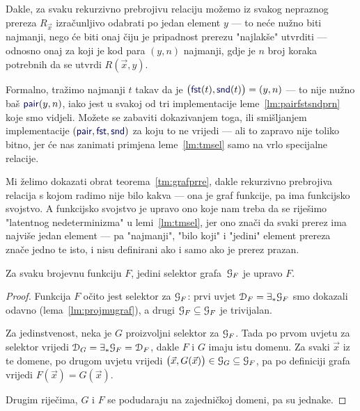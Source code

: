 

Dakle, za svaku rekurzivno prebrojivu relaciju možemo iz svakog nepraznog prereza $R_{\vec x}$ izračunljivo odabrati po jedan element $y$ --- to neće nužno biti najmanji, nego će biti onaj čiju je pripadnost prerezu "najlakše" utvrditi --- odnosno onaj za koji je kod para $(y,n)$ najmanji, gdje je $n$ broj koraka potrebnih da se utvrdi $R(\vec x,y)$.

Formalno, tražimo najmanji $t$ takav da je $\bigl(\f{fst}(t),\f{snd}(t)\bigr)=(y,n)$ --- to nije nužno baš $\f{pair}(y,n)$, iako jest u svakoj od tri implementacije leme~\ref{lm:pairfstsndprn} koje smo vidjeli. Možete se zabaviti dokazivanjem toga, ili smišljanjem implementacije $(\f{pair},\f{fst},\f{snd})$ za koju to ne vrijedi --- ali to zapravo nije toliko bitno, jer će nas zanimati primjena leme~\ref{lm:tmsel} samo na vrlo specijalne relacije.

Mi želimo dokazati obrat teorema~\ref{tm:grafprre}, dakle rekurzivno prebrojiva relacija s kojom radimo nije bilo kakva --- ona je graf funkcije, pa ima funkcijsko svojstvo. A funkcijsko svojstvo je upravo ono koje nam treba da se riješimo "latentnog nedeterminizma" u lemi~\ref{lm:tmsel}, jer ono znači da svaki prerez ima najviše jedan element --- pa "najmanji", "bilo koji" i "jedini" element prereza znače jedno te isto, i nisu definirani ako i samo ako je prerez prazan.

\begin{lema}[{name=[jedinstvenost selektora grafa funkcije]}]\label{lm:selgraf}
Za svaku brojevnu funkciju $F$, jedini selektor grafa\, $\mathcal G_{F}$ je upravo $F$.
\end{lema}
\begin{proof}
Funkcija $F$ očito jest selektor za $\mathcal G_{F}$: prvi uvjet $\mathcal D_{F}=\exists_*\mathcal G_{F}$ smo dokazali odavno (lema~\ref{lm:projmugraf}), a drugi $\mathcal G_{F}\subseteq\mathcal G_{F}$ je trivijalan.

Za jedinstvenost, neka je $G$ proizvoljni selektor za $\mathcal G_{F}$. Tada po prvom uvjetu za selektor vrijedi $\mathcal D_{G}=\exists_*\mathcal G_{F}=\mathcal D_{F}$, dakle $F$ i $G$ imaju istu domenu. Za svaki $\vec x$ iz te domene, po drugom uvjetu vrijedi $\bigl(\vec x,G(\vec x)\bigr)\in\mathcal G_{G}\subseteq\mathcal G_{F}$, pa po definiciji grafa vrijedi $F(\vec x)=G(\vec x)$.

Drugim riječima, $G$ i $F$ se podudaraju na zajedničkoj domeni, pa su jednake.
\end{proof}

